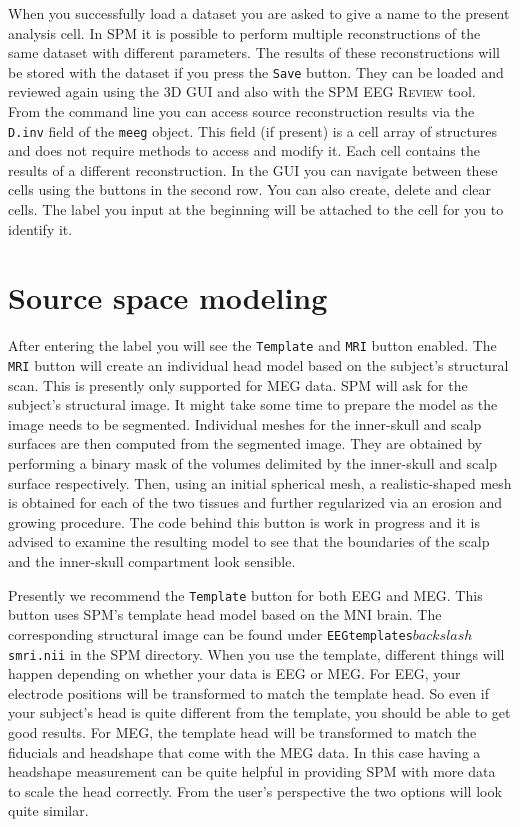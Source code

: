 When you successfully load a dataset you are asked to give a name to the present analysis cell. In SPM it is possible to perform multiple reconstructions of the same dataset with different parameters. The results of these reconstructions will be stored with the dataset if you press the \texttt{Save} button. They can be loaded and reviewed again using the 3D GUI and also with the SPM EEG \textsc{Review} tool. From the command line you can access source reconstruction results via the \texttt{D.inv} field of the \texttt{meeg} object. This field (if present) is a cell array of structures and does not require methods to access and modify it. Each cell contains the results of a different reconstruction. In the GUI you can navigate between these cells using the buttons in the second row. You can also create, delete and clear cells. The label you input at the beginning will be attached to the cell for you to identify it.


\section{Source space modeling}

After entering the label you will see the \texttt{Template} and \texttt{MRI} button enabled. The \texttt{MRI} button will create an individual head model based on the subject's structural scan. This is presently only supported for MEG data. SPM will ask for the subject's structural image. It might take some time to prepare the model as the image  needs to be segmented. Individual meshes for the inner-skull and scalp surfaces are then computed from the segmented image. They are obtained by performing a binary mask of the volumes delimited by the inner-skull and scalp surface respectively. Then, using an initial spherical mesh, a realistic-shaped mesh is obtained for each of the two tissues and further regularized via an erosion and growing procedure. The code behind this button is work in progress and it is advised to examine the resulting model to see that the boundaries of the scalp and the inner-skull compartment look sensible.

Presently we recommend the \texttt{Template} button for both EEG and MEG. This button uses SPM's template head model based on the MNI brain. The corresponding structural image can be found under \texttt{EEGtemplates$backslash$smri.nii} in the SPM directory. When you use the template, different things will happen depending on whether your data is EEG or MEG. For EEG, your electrode positions will be transformed to match the template head. So even if your subject's head is quite different from the template, you should be able to get good results. For MEG, the template head will be transformed to match the fiducials and headshape that come with the MEG data. In this case having a headshape measurement can be quite helpful in providing SPM with more data to scale the head correctly. From the user's perspective the two options will look quite similar.

